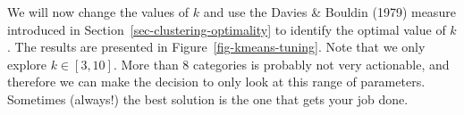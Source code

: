 \documentclass[
  letterpaper,
]{scrbook}
\begin{document}
We will now change the values of \(k\) and use the Davies \& Bouldin
(1979) measure introduced in Section~\ref{sec-clustering-optimality} to
identify the optimal value of \(k\). The results are presented in
Figure~\ref{fig-kmeans-tuning}. Note that we only explore
\(k \in [3, 10]\). More than 8 categories is probably not very
actionable, and therefore we can make the decision to only look at this
range of parameters. Sometimes (always!) the best solution is the one
that gets your job done.

{
\makeatletter
\def\LT@makecaption#1#2#3{%
  \noalign{\smash{\hbox{\kern\textwidth\rlap{\kern\marginparsep
  \parbox[t]{\marginparwidth}{%
    \footnotesize{%
      \vspace{(1.1\baselineskip)}
    #1{#2: }\ignorespaces #3}}}}}}%
    }
\makeatother

\begin{figure}[bt]



\end{figure}%

}
\end{document}
